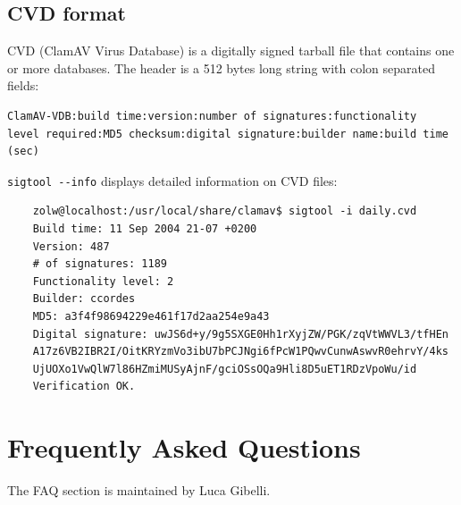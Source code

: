 \documentclass[a4paper,titlepage,12pt]{article}
\begin{document}
    \subsection{CVD format}
    CVD (ClamAV Virus Database) is a digitally signed tarball file that
    contains one or more databases. The header is a 512 bytes long string
    with colon separated fields:
    \begin{verbatim}
ClamAV-VDB:build time:version:number of signatures:functionality
level required:MD5 checksum:digital signature:builder name:build time (sec)
    \end{verbatim}
    \verb+sigtool --info+ displays detailed information on CVD files:
    \begin{verbatim}
    zolw@localhost:/usr/local/share/clamav$ sigtool -i daily.cvd 
    Build time: 11 Sep 2004 21-07 +0200
    Version: 487
    # of signatures: 1189
    Functionality level: 2
    Builder: ccordes
    MD5: a3f4f98694229e461f17d2aa254e9a43
    Digital signature: uwJS6d+y/9g5SXGE0Hh1rXyjZW/PGK/zqVtWWVL3/tfHEn
    A17z6VB2IBR2I/OitKRYzmVo3ibU7bPCJNgi6fPcW1PQwvCunwAswvR0ehrvY/4ks
    UjUOXo1VwQlW7l86HZmiMUSyAjnF/gciOSsOQa9Hli8D5uET1RDzVpoWu/id
    Verification OK.
    \end{verbatim}

    \section{Frequently Asked Questions}
    The FAQ section is maintained by Luca Gibelli.
\end{document}
